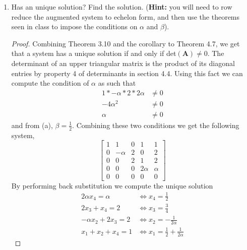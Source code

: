 \documentclass[11pt]{scrartcl}
\begin{document}
\begin{enumerate}[label=\alph*.]
{\begin{proof}
		      This is when $\beta \neq \frac12$.
		      We observe that there will be no conditions on $\alpha$.
	      \end{proof}
	      }
	\item{
	      Has an unique solution? Find the solution.
	      (\textbf{Hint:} you will need to row reduce the augmented system to echelon form,
	      and then use the theorems seen in class to impose the conditions on $\alpha$ and $\beta$).
	      \begin{proof}
		      Combining Theorem 3.10 and the corollary to Theorem 4.7, we get that a system has a
		      unique solution if and only if det$(\mathbf{A}) \neq 0$.
		      The determinant of an upper triangular matrix is the product of its diagonal
		      entries by property 4 of determinants in section 4.4.
		      Using this fact we can compute the condition of $\alpha$ as such that
		      \begin{align*}
			      1*-\alpha*2*2\alpha & \neq 0 \\
			      -4\alpha^2          & \neq 0 \\
			      \alpha              & \neq 0
		      \end{align*}
		      and from (a), $\beta = \frac12$. Combining these two conditions we get the following system,
		      \[
			      \left [ \begin{array}{cccc|c}
					      1 & 1        & 0 & 1       & 1      \\
					      0 & - \alpha & 2 & 0       & 2      \\
					      0 & 0        & 2 & 1       & 2      \\
					      0 & 0        & 0 & 2\alpha & \alpha \\
					      0 & 0        & 0 & 0       & 0
				      \end{array} \right ]
		      \]
		      By performing back substitution we compute the unique solution
		      \begin{align*}
			      2\alpha x_4 = \alpha   & \Leftrightarrow x_4 = \frac12                     \\
			      2x_3 + x_4 = 2         & \Leftrightarrow x_3 = \frac34                     \\
			      -\alpha x_2 + 2x_3 = 2 & \Leftrightarrow x_2  = -\frac{1}{2\alpha}         \\
			      x_1 + x_2 + x_4 = 1    & \Leftrightarrow x_ 1 =\frac12 + \frac{1}{2\alpha}
		      \end{align*}


\end{proof}}
\end{enumerate}
\end{document}
